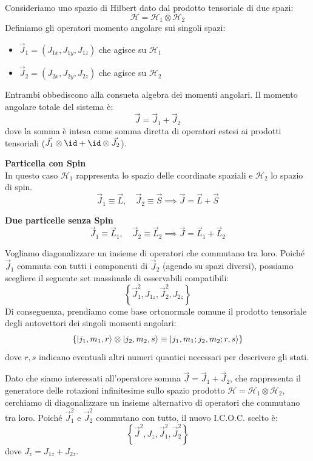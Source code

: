 Consideriamo uno spazio di Hilbert dato dal prodotto tensoriale di due spazi:
\[
    \mathcal{H} = \mathcal{H}_1 \otimes \mathcal{H}_2
\]
Definiamo gli operatori momento angolare sui singoli spazi:
\begin{itemize}
    \item \( \vec{J}_1 = (J_{1x}, J_{1y}, J_{1z}) \) che agisce su \( \mathcal{H}_1 \)
    \item \( \vec{J}_2 = (J_{2x}, J_{2y}, J_{2z}) \) che agisce su \( \mathcal{H}_2 \)
\end{itemize}
Entrambi obbediscono alla consueta algebra dei momenti angolari. Il momento angolare totale del sistema è:
\begin{equation}
    \vec{J} = \vec{J}_1 + \vec{J}_2
\end{equation}
dove la somma è intesa come somma diretta di operatori estesi ai prodotti tensoriali (\( \vec{J}_1 \otimes \id + \id \otimes \vec{J}_2 \)).

\begin{example}
    \textbf{Particella con Spin} \\
    In questo caso \( \mathcal{H}_1 \) rappresenta lo spazio delle coordinate spaziali e \( \mathcal{H}_2 \) lo spazio di spin.
    \[
        \vec{J}_1 \equiv \vec{L}, \quad \vec{J}_2 \equiv \vec{S} \implies \vec{J} = \vec{L} + \vec{S}
    \]
\end{example}

\begin{example}
    \textbf{Due particelle senza Spin}
    \[
        \vec{J}_1 \equiv \vec{L}_1, \quad \vec{J}_2 \equiv \vec{L}_2 \implies \vec{J} = \vec{L}_1 + \vec{L}_2
    \]
\end{example}

Vogliamo diagonalizzare un insieme di operatori che commutano tra loro. Poiché \( \vec{J}_1 \) commuta con tutti i componenti di \( \vec{J}_2 \) (agendo su spazi diversi),
possiamo scegliere il seguente set massimale di osservabili compatibili:
\begin{equation}
    \left\{ \vec{J}_1^2, J_{1z}, \vec{J}_2^2, J_{2z} \right\}
\end{equation}
Di conseguenza, prendiamo come base ortonormale comune il prodotto tensoriale degli autovettori dei singoli momenti angolari:
\[
    \left\{ \ket{j_1, m_1, r} \otimes \ket{j_2, m_2, s} \equiv \ket{j_1, m_1; j_2, m_2; r, s} \right\}
\]
dove \( r,s \) indicano eventuali altri numeri quantici necessari per descrivere gli stati.

Dato che siamo interessati all'operatore somma \( \vec{J} = \vec{J}_1 + \vec{J}_2 \), che rappresenta il generatore delle rotazioni infinitesime sullo spazio prodotto \( \mathcal{H} = \mathcal{H}_1 \otimes \mathcal{H}_2 \), 
cerchiamo di diagonalizzare un insieme alternativo di operatori che commutano tra loro. Poiché \( \vec{J}_1^2 \) e \( \vec{J}_2^2 \) commutano con tutto, il nuovo I.C.O.C. scelto è:
\begin{equation}
    \left\{ \vec{J}^2, J_z, \vec{J}_1^2, \vec{J}_2^2 \right\}
\end{equation}
dove \( J_z = J_{1z} + J_{2z} \).

